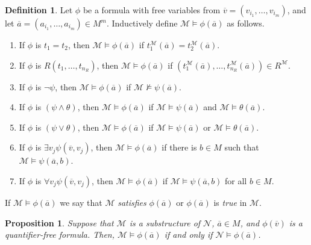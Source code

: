 \documentclass{amsart}
\newtheorem{proposition}[theorem]{Proposition}
\theoremstyle{definition}
\newtheorem{definition}[theorem]{Definition}
\numberwithin{equation}{section}
\begin{document}
\begin{definition}
	Let $\phi$ be a formula with free variables from
	$\overline{v} = (v_{i_1},\dots,v_{i_m})$, and let
	$\overline{a} = (a_{i_1},\dots,a_{i_m})\in M^m$.
	Inductively define \emph{$\mathcal{M} \models \phi(\overline{a})$} as follows.
	\begin{enumerate}[label = {\roman*)}]
		\item If $\phi$ is $t_1 = t_2$, then $\mathcal{M} \models \phi(\overline{a})$
		      if $t_1^{\mathcal{M}}(\overline{a}) = t_2^{\mathcal{M}}(\overline{a})$.
		\item If $\phi$ is $R(t_1,\dots,t_{n_R})$, then $\mathcal{M} \models \phi(\overline{a})$
		      if $(t^{\mathcal{M}}_1(\overline{a}),\dots,t^{\mathcal{M}}_{n_R}(\overline{a})) \in R^{\mathcal{M}}$.
		\item If $\phi$ is $\neg \psi$, then $\mathcal{M} \models \phi(\overline{a})$ if $\mathcal{M} \not\models \psi(\overline{a})$.
		\item If $\phi$ is $(\psi \land \theta)$, then $\mathcal{M} \models \phi(\overline{a})$
		      if $\mathcal{M} \models \psi(\overline{a})$ and $\mathcal{M} \models \theta(\overline{a})$.
		\item If $\phi$ is $(\psi \lor \theta)$, then $\mathcal{M} \models \phi(\overline{a})$
		      if $\mathcal{M} \models \psi(\overline{a})$ or $\mathcal{M} \models \theta(\overline{a})$.
		\item If $\phi$ is $\exists v_j \psi(\overline{v},v_j)$, then $\mathcal{M} \models \phi(\overline{a})$
		      if there is $b \in M$ such that $\mathcal{M} \models \psi(\overline{a},b)$.
		\item If $\phi$ is $\forall v_j \psi(\overline{v},v_j)$,
		      then $\mathcal{M} \models \phi(\overline{a})$ if $\mathcal{M} \models \psi(\overline{a},b)$ for all $b \in M$.
	\end{enumerate}
	If $\mathcal{M} \models \phi(\overline{a})$ we say that
	$\mathcal{M}$ \emph{satisfies} $\phi(\overline{a})$ or $\phi(\overline{a})$ is \emph{true} in $\mathcal{M}$.
\end{definition}

\begin{proposition}
	Suppose that $\mathcal{M}$ is a substructure of $\mathcal{N}$,
	$\overline{a} \in M$, and $\phi(\overline{v})$ is a quantifier-free formula.
	Then, $\mathcal{M} \models \phi(\overline{a})$ if and only if $\mathcal{N} \models \phi(\overline{a})$.
\end{proposition}
\end{document}
